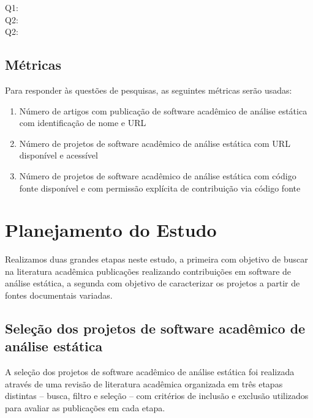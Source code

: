 
\begin{description}
  \item [Q1:] \EstudoUmQuestaoUm
  \item [Q2:] \EstudoUmQuestaoDois
  \item [Q2:] \EstudoUmQuestaoTres
\end{description}

\subsection{Métricas}

Para responder às questões de pesquisas, as seguintes métricas serão usadas:

\begin{enumerate}
  \item Número de artigos com publicação de software acadêmico de análise estática com identificação de nome e URL
  \item Número de projetos de software acadêmico de análise estática com URL disponível e acessível
  \item Número de projetos de software acadêmico de análise estática com código fonte disponível e com permissão explícita de contribuição via código fonte
\end{enumerate}


\section{Planejamento do Estudo} \label{estudo1:planejamento}

Realizamos duas grandes etapas neste estudo, a primeira com objetivo de buscar
na literatura acadêmica publicações realizando contribuições em software de
análise estática, a segunda com objetivo de caracterizar os projetos a partir
de fontes documentais variadas.

\subsection{Seleção dos projetos de software acadêmico de análise estática} %

A seleção dos projetos de software acadêmico de análise estática foi realizada
através de uma revisão de literatura acadêmica organizada em três etapas
distintas -- busca, filtro e seleção -- com critérios de inclusão e exclusão
utilizados para avaliar as publicações em cada etapa.

